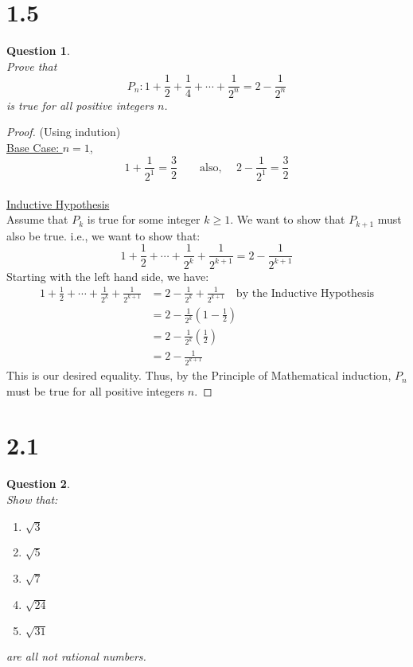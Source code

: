\documentclass[10pt,a4paper]{article}
\newtheorem*{question*}{Question}
\begin{document}
\section*{1.5}
\begin{question*}{$ $}
\\Prove that
\[P_n: 1 + \frac{1}{2} + \frac{1}{4} + \cdots + \frac{1}{2^n} = 2 - \frac{1}{2^n}\]
is true for all positive integers $n$.
\end{question*}

\begin{proof}{(Using indution)}
\\\underline{Base Case: $n = 1$,}
\[1 + \frac{1}{2^1} = \frac{3}{2} \quad \quad \text{also, } \quad 2 - \frac{1}{2^1} = \frac{3}{2}\]
\\\underline{Inductive Hypothesis}
\\Assume that $P_k$ is true for some integer $k \geq 1$. We want to show that $P_{k+1}$ must also be true. i.e., we want to show that:
\[1 + \frac{1}{2} + \cdots + \frac{1}{2^k} + \frac{1}{2^{k+1}} = 2 - \frac{1}{2^{k+1}}\]
Starting with the left hand side, we have:
\begin{align*}
1 + \frac{1}{2} + \cdots + \frac{1}{2^k} + \frac{1}{2^{k+1}} &= 2 - \frac{1}{2^k} + \frac{1}{2^{k+1}} \quad \text{by the Inductive Hypothesis}\\
&= 2 - \frac{1}{2^k}\left(1 - \frac{1}{2}\right)\\
&= 2 - \frac{1}{2^k}\left(\frac{1}{2}\right)\\
&= 2 - \frac{1}{2^{k+1}}
\end{align*}
This is our desired equality. Thus, by the Principle of Mathematical induction, $P_n$ must be true for all positive integers $n$. 
\end{proof}

\section*{2.1}
\begin{question*}{$ $}
\\Show that:
\begin{enumerate}[label=\alph*)]
\item $\sqrt{3}$
\item $\sqrt{5}$
\item $\sqrt{7}$
\item $\sqrt{24}$
\item $\sqrt{31}$
\end{enumerate}
are all not rational numbers.
\end{question*}
\end{document}
